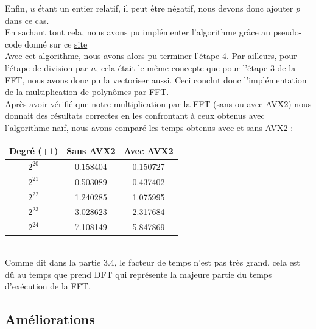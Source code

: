 \documentclass[12pt, a4paper]{article}
\begin{document}
Enfin, $u$ étant un entier relatif, il peut être négatif, nous devons donc ajouter $p$ dans ce cas. \\
\indent En sachant tout cela, nous avons pu implémenter l'algorithme grâce au pseudo-code donné sur ce \href{https://www.intel.com/content/www/us/en/docs/intrinsics-guide/index.html#techs=AVX,AVX2}{\underline{\color{blue}site}} \\
\indent Avec cet algorithme, nous avons alors pu terminer l'étape 4. Par ailleurs, pour l'étape de division par $n$, cela était le même concepte que pour l'étape 3 de la FFT, nous avons donc pu la vectoriser aussi. Ceci conclut donc l'implémentation de la multiplication de polynômes par FFT. \\
\indent Après avoir vérifié que notre multiplication par la FFT (sans ou avec AVX2) nous donnait des résultats correctes en les confrontant à ceux obtenus avec l'algorithme naïf, nous avons comparé les temps obtenus avec et sans AVX2 :

\begin{center}
\begin{tabular}{||c c c||}
\hline
Degré (+1) & Sans AVX2 & Avec AVX2 \\
\hline\hline
$2^{20}$ & 0.158404 & 0.150727 \\
\hline
$2^{21}$ & 0.503089 & 0.437402 \\
\hline
$2^{22}$ & 1.240285 & 1.075995 \\
\hline
$2^{23}$ & 3.028623 & 2.317684 \\
\hline
$2^{24}$ & 7.108149 & 5.847869 \\
\hline
\end{tabular}
\end{center}
{}
\ \\
\indent Comme dit dans la partie 3.4, le facteur de temps n'est pas très grand, cela est dû au temps que prend DFT qui représente la majeure partie du temps d'exécution de la FFT.

\subsection{Améliorations}
\end{document}

